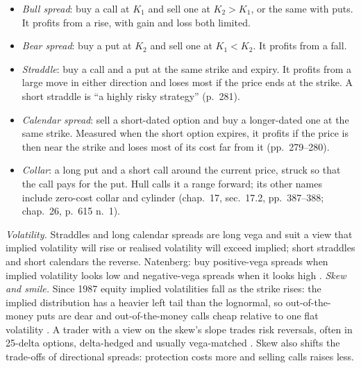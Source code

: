 \begin{qfmethod}\label{meth:option-spreads-volatility-strategies}
 \citep[chap.~12, secs.~12.3--12.4, pp.~272--284]{s7-hulloptions}
\begin{itemize}
\item \emph{Bull spread}: buy a call at $K_1$ and sell one at $K_2>K_1$, or the same with puts. It profits from a rise, with gain and loss both limited.
\item \emph{Bear spread}: buy a put at $K_2$ and sell one at $K_1<K_2$. It profits from a fall.
\item \emph{Straddle}: buy a call and a put at the same strike and expiry. It profits from a large move in either direction and loses most if the price ends at the strike. A short straddle is ``a highly risky strategy'' (p.~281).
\item \emph{Calendar spread}: sell a short-dated option and buy a longer-dated one at the same strike. Measured when the short option expires, it profits if the price is then near the strike and loses most of its cost far from it (pp.~279--280).
\item \emph{Collar}: a long put and a short call around the current price, struck so that the call pays for the put. Hull calls it a range forward; its other names include zero-cost collar and cylinder (chap.~17, sec.~17.2, pp.~387--388; chap.~26, p.~615 n.~1).
\end{itemize}

\emph{Volatility.} Straddles and long calendar spreads are long vega and suit a view that implied volatility will rise or realised volatility will exceed implied; short straddles and short calendars the reverse. Natenberg: buy positive-vega spreads when implied volatility looks low and negative-vega spreads when it looks high \citep[chap.~11, p.~199]{s7-natenberg}. \emph{Skew and smile.} Since 1987 equity implied volatilities fall as the strike rises: the implied distribution has a heavier left tail than the lognormal, so out-of-the-money puts are dear and out-of-the-money calls cheap relative to one flat volatility \citep[chap.~20, sec.~20.3, pp.~456--458]{s7-hulloptions}. A trader with a view on the skew's slope trades risk reversals, often in 25-delta options, delta-hedged and usually vega-matched \citep[chap.~24, pp.~502--503]{s7-natenberg}. Skew also shifts the trade-offs of directional spreads: protection costs more and selling calls raises less.


\end{qfmethod}

